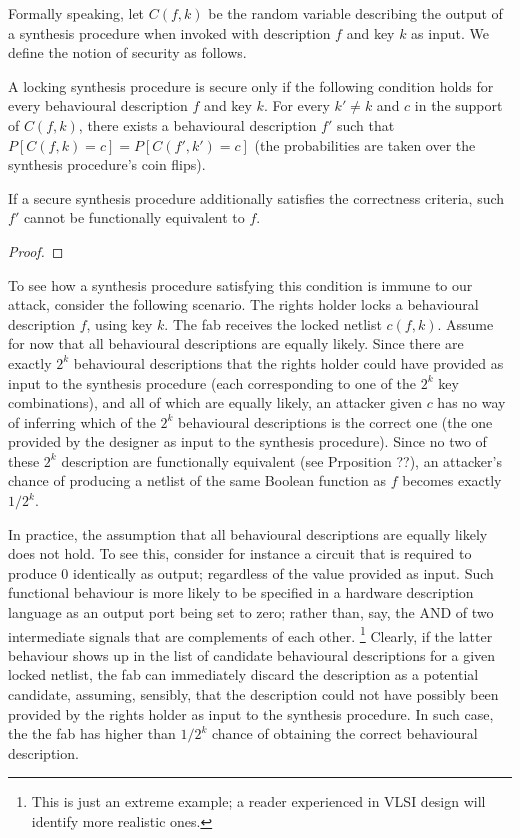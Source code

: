 Formally speaking, let $C(f,k)$ be the random variable describing the output of a synthesis procedure when invoked with description $f$ and key $k$ as input. We define the notion of security as follows.
\begin{definition}
A locking synthesis procedure is secure only if the following condition holds for every behavioural description $f$ and key $k$. For every $k'\neq k$ and $c$ in the support of $C(f,k)$, there exists a behavioural description $f'$ such that
$P[C(f,k)=c]= P[C(f',k')=c]$
(the probabilities are taken over the synthesis procedure's coin flips).

\begin{proposition}
If a secure synthesis procedure additionally satisfies the correctness criteria, such $f'$ cannot be functionally equivalent to $f$.
\end{proposition}
\begin{proof}
\end{proof}

To see how a synthesis procedure satisfying this condition is immune to our attack, consider the following scenario. The rights holder locks a behavioural description $f$, using key $k$. The fab receives the locked netlist $c(f,k)$. Assume for now that all behavioural descriptions are equally likely. Since there are exactly $2^k$ behavioural descriptions that the rights holder could have provided as input to the synthesis procedure (each corresponding to one of the $2^k$ key combinations), and all of which are equally likely, an attacker given $c$ has no way of inferring which of the $2^k$ behavioural descriptions is the correct one (the one provided by the designer as input to the synthesis procedure). Since no two of these $2^k$ description are functionally equivalent (see Prposition ??), an attacker's chance of producing a netlist of the same Boolean function as $f$ becomes exactly $1/{2^k}$.

In practice, the assumption that all behavioural descriptions are equally likely does not hold. To see this, consider for instance a circuit that is required to produce $0$ identically as output; regardless of the value provided as input. Such functional behaviour is more likely to be specified in a hardware description language as an output port being set to zero; rather than, say, the AND of two intermediate signals that are complements of each other. \footnote{This is just an extreme example; a reader experienced in VLSI design will identify more realistic ones.} Clearly, if the latter behaviour shows up in the list of candidate behavioural descriptions for a given locked netlist, the fab can immediately discard the description as a potential candidate, assuming, sensibly, that the description could not have possibly been provided by the rights holder as input to the synthesis procedure. In such case, the 
the fab has higher than $1/{2^k}$ chance of obtaining the correct behavioural description.


\end{definition}
